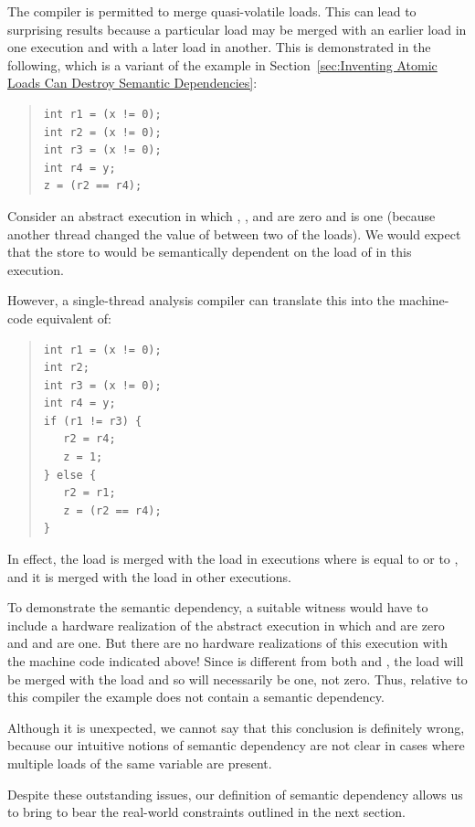\documentclass[10]{article}
\begin{document}
The compiler is permitted to merge quasi-volatile loads.
This can lead to surprising results because a particular load
may be merged with an earlier load in one execution and with a
later load in another.
This is demonstrated in the following, which is a variant of
the example in
Section~\ref{sec:Inventing Atomic Loads Can Destroy Semantic Dependencies}:
\begin{quote}
\begin{verbatim}
int r1 = (x != 0);
int r2 = (x != 0);
int r3 = (x != 0);
int r4 = y;
z = (r2 == r4);
\end{verbatim}
\end{quote}
Consider an abstract execution in which , , and 
are zero and  is one (because another thread changed the value
of  between two of the loads).
We would expect that the store to  would be semantically
dependent on the load of  in this execution.

However, a single-thread analysis compiler can translate this into the
machine-code equivalent of:
\begin{quote}
\begin{verbatim}
int r1 = (x != 0);
int r2;
int r3 = (x != 0);
int r4 = y;
if (r1 != r3) {
   r2 = r4;
   z = 1;
} else {
   r2 = r1;
   z = (r2 == r4);
}
\end{verbatim}
\end{quote}
In effect, the  load is merged with the  load in
executions where  is equal to  or to , and it is
merged with the  load in other executions.

To demonstrate the semantic dependency, a suitable witness would have
to include a hardware realization of the abstract execution in which
 and  are zero and  and  are one.
But there are no hardware realizations of this execution with the
machine code indicated above!
Since  is different from both  and , the 
load will be merged with the  load and so  will
necessarily be one, not zero.
Thus, relative to this compiler the example does not contain a
semantic dependency.

Although it is unexpected, we cannot say that this conclusion is
definitely wrong, because our intuitive notions of semantic
dependency are not clear in cases where multiple loads of the same
variable are present.

Despite these outstanding issues, our definition of semantic dependency
allows us to bring to bear the real-world constraints outlined in the
next section.
\end{document}
